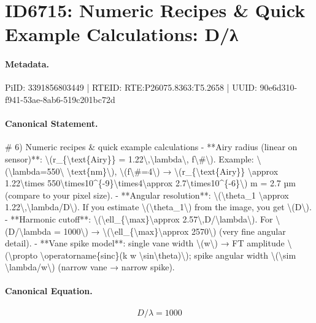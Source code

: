 \section*{ID6715: Numeric Recipes \& Quick Example Calculations: D/λ}
\paragraph{Metadata.}
PiID: 3391856803449 | RTEID: RTE:P26075.8363:T5.2658 | UUID: 90e6d310-f941-53ae-8ab6-519c201bc72d

\paragraph{Canonical Statement.}
\# 6) Numeric recipes \& quick example calculations - **Airy radius (linear on sensor)**: \textbackslash{}(r\_\{\textbackslash{}text\{Airy\}\} = 1.22\textbackslash{},\textbackslash{}lambda\textbackslash{}, f\textbackslash{}\#\textbackslash{}). Example: \textbackslash{}(\textbackslash{}lambda=550\textbackslash{} \textbackslash{}text\{nm\}\textbackslash{}), \textbackslash{}(f\textbackslash{}\#=4\textbackslash{}) → \textbackslash{}(r\_\{\textbackslash{}text\{Airy\}\} \textbackslash{}approx 1.22\textbackslash{}times 550\textbackslash{}times10\textasciicircum{}\{-9\}\textbackslash{}times4\textbackslash{}approx 2.7\textbackslash{}times10\textasciicircum{}\{-6\}\textbackslash{}) m = 2.7 µm (compare to your pixel size). - **Angular resolution**: \textbackslash{}(\textbackslash{}theta\_1 \textbackslash{}approx 1.22\textbackslash{},\textbackslash{}lambda/D\textbackslash{}). If you estimate \textbackslash{}(\textbackslash{}theta\_1\textbackslash{}) from the image, you get \textbackslash{}(D\textbackslash{}). - **Harmonic cutoff**: \textbackslash{}(\textbackslash{}ell\_\{\textbackslash{}max\}\textbackslash{}approx 2.57\textbackslash{},D/\textbackslash{}lambda\textbackslash{}). For \textbackslash{}(D/\textbackslash{}lambda = 1000\textbackslash{}) → \textbackslash{}(\textbackslash{}ell\_\{\textbackslash{}max\}\textbackslash{}approx 2570\textbackslash{}) (very fine angular detail). - **Vane spike model**: single vane width \textbackslash{}(w\textbackslash{}) → FT amplitude \textbackslash{}(\textbackslash{}propto \textbackslash{}operatorname\{sinc\}(k w \textbackslash{}sin\textbackslash{}theta)\textbackslash{}); spike angular width \textbackslash{}(\textbackslash{}sim \textbackslash{}lambda/w\textbackslash{}) (narrow vane → narrow spike).

\paragraph{Canonical Equation.}
\[
D/\lambda = 1000
\]

